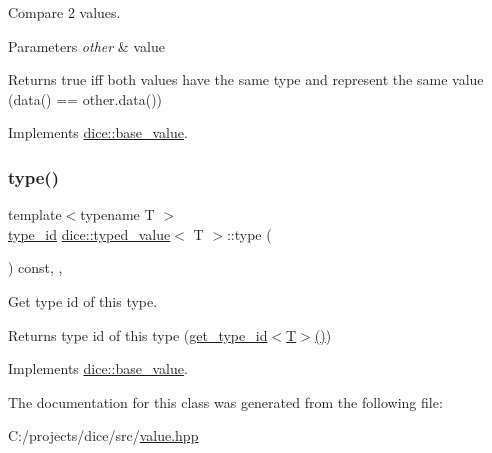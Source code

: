Compare 2 values. 


\begin{DoxyParams}{Parameters}
{\em other} & value \\
\hline
\end{DoxyParams}
\begin{DoxyReturn}{Returns}
true iff both values have the same type and represent the same value (data() == other.\+data()) 
\end{DoxyReturn}


Implements \mbox{\hyperlink{classdice_1_1base__value_a81269be4c101eeef6d48810823e1835c}{dice\+::base\+\_\+value}}.

\mbox{\label{classdice_1_1typed__value_aa75a4167e6d3ff2640fd2fa65442e2ed}} 
\subsubsection{\texorpdfstring{type()}{type()}}
{\footnotesize\ttfamily template$<$typename T $>$ \\
\mbox{\hyperlink{value_8hpp_ab9af7d8ecc381e026ca4d07a745f23eb}{type\+\_\+id}} \mbox{\hyperlink{classdice_1_1typed__value}{dice\+::typed\+\_\+value}}$<$ T $>$\+::type (\begin{DoxyParamCaption}{ }\end{DoxyParamCaption}) const\hspace{0.3cm}{\ttfamily [inline]}, {\ttfamily [override]}, {\ttfamily [virtual]}}



Get type id of this type. 

\begin{DoxyReturn}{Returns}
type id of this type (\mbox{\hyperlink{value_8hpp_a7d7815802a2d6911ce76500f32b25399}{get\+\_\+type\+\_\+id$<$\+T$>$()}}) 
\end{DoxyReturn}


Implements \mbox{\hyperlink{classdice_1_1base__value_a5125d076b0ed6a398f4f4f8fe19ef60b}{dice\+::base\+\_\+value}}.



The documentation for this class was generated from the following file\+:\begin{DoxyCompactItemize}
\item 
C\+:/projects/dice/src/\mbox{\hyperlink{value_8hpp}{value.\+hpp}}\end{DoxyCompactItemize}
